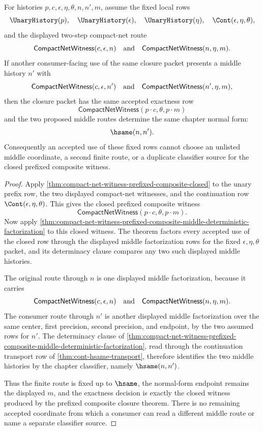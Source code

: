 \begin{corollary}
\label{cor:compact-net-witness-prefixed-composite-closure-determinacy}
For histories $p,c,\epsilon,\eta,\theta,n,n',m$, assume the fixed local rows
$$
\UnaryHistory(p),\quad
\UnaryHistory(\epsilon),\quad
\UnaryHistory(\eta),\quad
\Cont(\epsilon,\eta,\theta),
$$
and the displayed two-step compact-net route
$$
\mathsf{CompactNetWitness}(c,\epsilon,n)
\quad\hbox{and}\quad
\mathsf{CompactNetWitness}(n,\eta,m).
$$
If another consumer-facing use of the same closure packet presents a middle
history $n'$ with
$$
\mathsf{CompactNetWitness}(c,\epsilon,n')
\quad\hbox{and}\quad
\mathsf{CompactNetWitness}(n',\eta,m),
$$
then the closure packet has the same accepted exactness row
$$
\mathsf{CompactNetWitness}(p\cdot c,\theta,p\cdot m)
$$
and the two proposed middle routes determine the same chapter normal form:
$$
\hsame(n,n').
$$
Consequently an accepted use of these fixed rows cannot choose an unlisted
middle coordinate, a second finite route, or a duplicate classifier source for
the closed prefixed composite witness.
\end{corollary}
\begin{proof}
Apply \autoref{thm:compact-net-witness-prefixed-composite-closed} to the unary
prefix row, the two displayed compact-net witnesses, and the continuation row
$\Cont(\epsilon,\eta,\theta)$. This gives the closed prefixed composite witness
$$
\mathsf{CompactNetWitness}(p\cdot c,\theta,p\cdot m).
$$
Now apply
\autoref{thm:compact-net-witness-prefixed-composite-middle-deterministic-factorization}
to this closed witness. The theorem factors every accepted use of the closed
row through the displayed middle factorization rows for the fixed
$\epsilon,\eta,\theta$ packet, and its determinacy clause compares any two
such displayed middle histories.

The original route through $n$ is one displayed middle factorization, because
it carries
$$
\mathsf{CompactNetWitness}(c,\epsilon,n)
\quad\hbox{and}\quad
\mathsf{CompactNetWitness}(n,\eta,m).
$$
The consumer route through $n'$ is another displayed middle factorization over
the same center, first precision, second precision, and endpoint, by the two
assumed rows for $n'$. The determinacy clause of
\autoref{thm:compact-net-witness-prefixed-composite-middle-deterministic-factorization},
read through the continuation transport row of \autoref{thm:cont-hsame-transport},
therefore identifies the two middle histories by the chapter classifier,
namely $\hsame(n,n')$.

Thus the finite route is fixed up to $\hsame$, the normal-form endpoint remains
the displayed $m$, and the exactness decision is exactly the closed witness
produced by the prefixed composite closure theorem. There is no remaining
accepted coordinate from which a consumer can read a different middle route or
name a separate classifier source.
\end{proof}
